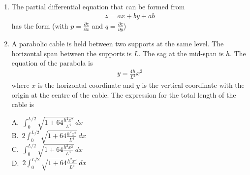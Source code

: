 \documentclass[journal,12pt,onecolumn]{IEEEtran}
\theoremstyle{remark}
\begin{document}
\begin{enumerate}
\noindent\item The partial differential equation that can be formed from 
\begin{align*}
z = ax + by + ab
\end{align*}
has the form (with $p = \frac{\partial z}{\partial x}$ and $q = \frac{\partial z}{\partial y}$)
\hfill{}
\begin{enumerate}
\end{enumerate}
\noindent\item A parabolic cable is held between two supports at the same level. The horizontal span between the supports is $L$. The sag at the mid-span is $h$. The equation of the parabola is 
\begin{align*}
y = \frac{4h}{L^2} x^2
\end{align*}
where $x$ is the horizontal coordinate and $y$ is the vertical coordinate with the origin at the centre of the cable. The expression for the total length of the cable is
\hfill{}

A.\ $\int_0^{L/2} \sqrt{1 + 64 \frac{h^2 x^2}{L^4}} \, dx$ \\
B.\ $2 \int_0^{L/2} \sqrt{1 + 64 \frac{h^2 x^2}{L^4}} \, dx$ \\
C.\ $\int_0^{L/2} \sqrt{1 + 64 \frac{h^2 x^2}{L^4}} \, dx$ \\
D.\ $2 \int_0^{L/2} \sqrt{1 + 64 \frac{h^2 x^2}{L^4}} \, dx$


\end{enumerate}
\end{document}
